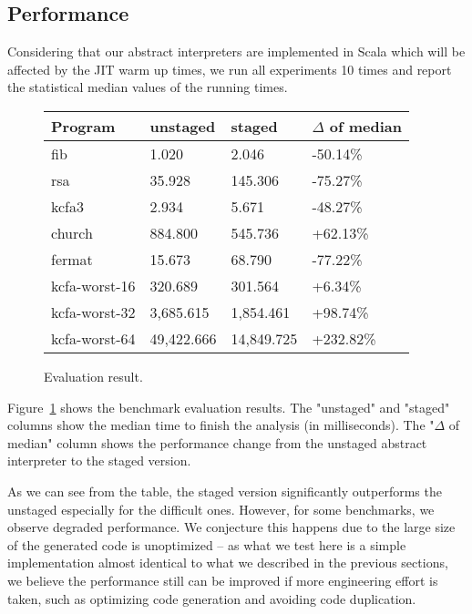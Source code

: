 \subsection{Performance}

Considering that our abstract interpreters are implemented in Scala which will be 
affected by the JIT warm up times, we run all experiments 10 times and report
the statistical median values of the running times.

\begin{figure}[h]
\begin{tabular}{@{}llll@{}}
\toprule
    Program            & unstaged   & staged     & $\Delta$ of median \\ \midrule
    fib                & 1.020      & 2.046      & -50.14\%          \\
    rsa                & 35.928     & 145.306    & -75.27\%          \\
    kcfa3              & 2.934      & 5.671      & -48.27\%          \\
    church             & 884.800    & 545.736    & +62.13\%          \\
    fermat             & 15.673     & 68.790     & -77.22\%          \\
    kcfa-worst-16      & 320.689    & 301.564    & +6.34\%           \\
    kcfa-worst-32      & 3,685.615  & 1,854.461  & +98.74\%          \\
    kcfa-worst-64      & 49,422.666 & 14,849.725 & +232.82\%         \\
    \bottomrule
\end{tabular}
\caption{Evaluation result.} \label{evaluation_result}
\end{figure}

Figure~\ref{evaluation_result} shows the benchmark evaluation results. The "unstaged" and "staged" columns
show the median time to finish the analysis (in milliseconds). The "$\Delta$ of median"
column shows the performance change from the unstaged abstract interpreter to the staged version.

As we can see from the table, the staged version significantly outperforms the unstaged especially 
for the difficult ones.
However, for some benchmarks, we observe degraded performance. 
We conjecture this happens due to the large size of the generated code is unoptimized -- 
as what we test here is a simple implementation almost identical to what we described in the previous sections,
we believe the performance still can be improved if more engineering effort is taken, 
such as optimizing code generation and avoiding code duplication.


